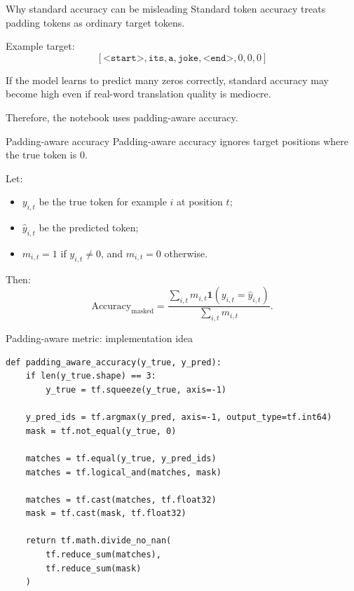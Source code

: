 \documentclass[aspectratio=169]{beamer}
\begin{document}
%
%
\begin{frame}[fragile]{Why standard accuracy can be misleading}
Standard token accuracy treats padding tokens as ordinary target tokens.

\vspace{0.3cm}
Example target:
\[
    [\texttt{<start>}, \texttt{its}, \texttt{a}, \texttt{joke}, \texttt{<end>}, 0, 0, 0]
\]

\vspace{0.3cm}
If the model learns to predict many zeros correctly, standard accuracy may become high even if real-word translation quality is mediocre.

\vspace{0.3cm}
Therefore, the notebook uses padding-aware accuracy.
\end{frame}
%
%
\begin{frame}[fragile]{Padding-aware accuracy}
Padding-aware accuracy ignores target positions where the true token is $0$.

\vspace{0.3cm}
Let:
\begin{itemize}
    \item $y_{i,t}$ be the true token for example $i$ at position $t$;
    \item $\hat{y}_{i,t}$ be the predicted token;
    \item $m_{i,t}=1$ if $y_{i,t}\neq 0$, and $m_{i,t}=0$ otherwise.
\end{itemize}

Then:
\[
    \text{Accuracy}_{\text{masked}}
    =
    \frac{\sum_{i,t} m_{i,t} \mathbf{1}(y_{i,t}=\hat{y}_{i,t})}
         {\sum_{i,t} m_{i,t}}.
\]
\end{frame}
%
%
\begin{frame}[fragile]{Padding-aware metric: implementation idea}
\begin{lstlisting}
def padding_aware_accuracy(y_true, y_pred):
    if len(y_true.shape) == 3:
        y_true = tf.squeeze(y_true, axis=-1)

    y_pred_ids = tf.argmax(y_pred, axis=-1, output_type=tf.int64)
    mask = tf.not_equal(y_true, 0)

    matches = tf.equal(y_true, y_pred_ids)
    matches = tf.logical_and(matches, mask)

    matches = tf.cast(matches, tf.float32)
    mask = tf.cast(mask, tf.float32)

    return tf.math.divide_no_nan(
        tf.reduce_sum(matches),
        tf.reduce_sum(mask)
    )
\end{lstlisting}
\end{frame}
\end{document}
